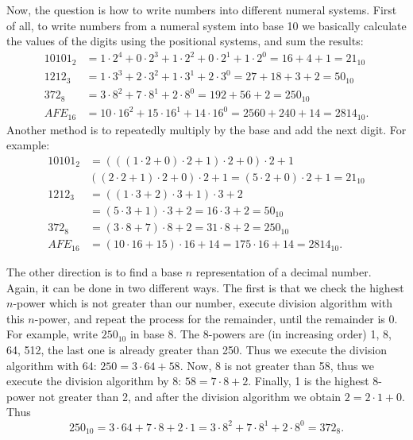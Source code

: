 Now, the question is how to write numbers into different numeral systems. 
First of all, to write numbers from a numeral system into base 10
we basically calculate the values of the digits using the positional systems, 
and sum the results: 
\begin{align*}
10101_2 &= 1 \cdot 2^4 + 0 \cdot 2^3 +1 \cdot 2^2 + 0 \cdot 2^1 + 1 \cdot 2^0 = 16 + 4 + 1 = 21_{10} \\
1212_3 &= 1 \cdot 3^3 + 2 \cdot 3^2 + 1 \cdot 3^1 + 2 \cdot 3^0 = 27 + 18 + 3 + 2 = 50_{10} \\
372_8 &= 3 \cdot 8^2 + 7 \cdot 8^1 + 2 \cdot 8^0 = 192 + 56 + 2 = 250_{10} \\
AFE_{16} &= 10 \cdot 16^2 + 15 \cdot 16^1 + 14 \cdot 16^0 = 2560 + 240 + 14 = 2814_{10}. 
\end{align*}
Another method is to repeatedly multiply by the base and add the next digit. 
For example: 
\begin{align*}
10101_2 &= (((1 \cdot 2 + 0 ) \cdot 2 + 1)\cdot 2 + 0) \cdot 2 + 1  \\
& ((2 \cdot 2 + 1)\cdot 2 + 0) \cdot 2 + 1 = (5 \cdot 2 + 0) \cdot 2 + 1=  21_{10} \\
1212_3 &= ((1 \cdot 3 + 2) \cdot 3 + 1) \cdot 3 + 2 \\
&= (5 \cdot 3 + 1)\cdot 3 + 2 = 16 \cdot 3 + 2 = 50_{10} \\
372_8 &= (3 \cdot 8 + 7) \cdot 8 + 2 = 31 \cdot 8 + 2 = 250_{10} \\
AFE_{16} &= (10 \cdot 16 + 15) \cdot 16 + 14 = 175 \cdot 16 + 14 = 2814_{10}. 
\end{align*}

The other direction is to find a base $n$ representation of a decimal number. 
Again, it can be done in two different ways. 
The first is that we check the highest $n$-power which is not greater than our number, 
execute division algorithm with this $n$-power, 
and repeat the process for the remainder, 
until the remainder is 0. 
For example, write $250_{10}$ in base 8. 
The 8-powers are (in increasing order) 1, 8, 64, 512, 
the last one is already greater than 250. 
Thus we execute the division algorithm with 64: 
$250 = 3 \cdot 64 + 58$. 
Now, 8 is not greater than 58, thus we execute the division algorithm by 8: 
$58 = 7 \cdot 8 + 2$. 
Finally, 
1 is the highest 8-power not greater than 2, 
and after the division algorithm we obtain $2 = 2 \cdot 1 +0$. 
Thus 
\[
250_{10} = 3 \cdot 64 + 7 \cdot 8 + 2 \cdot 1 = 3 \cdot 8^2 + 7 \cdot 8^1 + 2 \cdot 8^0 = 372_8. 
\]

